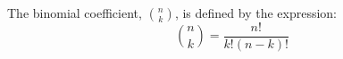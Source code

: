 \documentclass{article}
\begin{document}
The binomial coefficient, \(\binom{n}{k}\), is defined by the expression:
\[
    \binom{n}{k} = \frac{n!}{k!(n-k)!}
\]
\end{document}
